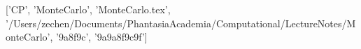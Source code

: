 ['CP', 'MonteCarlo', 'MonteCarlo.tex', '/Users/zechen/Documents/PhantasiaAcademia/Computational/LectureNotes/MonteCarlo', '\x9a\x8f\x9c\xba{}', '\xac{}\x9a\x9a\x8f\x9c\xba{}\xba{}\x9f']
